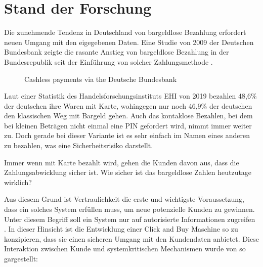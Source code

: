 \section{Stand der Forschung}


Die zunehmende Tendenz in Deutschland von bargeldlose Bezahlung erfordert neuen Umgang mit den 
eigegebenen Daten. Eine Studie von 2009 der Deutschen Bundesbank zeigte die rasante Anstieg von 
bargeldlose Bezahlung in der Bundesrepublik seit der Einführung von solcher Zahlungsmethode 
\cite{refrep:DBCP}.

\begin{figure}[htb]
    \caption{Cashless payments via the Deutsche Bundesbank}
    \label{fig:refrep_DB}
\end{figure}


Laut einer Statistik des Handelsforschungsinstituts EHI von 2019 \cite{refart:KSDL} bezahlen 48,6\% 
der deutschen ihre Waren mit Karte, wohingegen nur noch 46,9\% der deutschen den klassischen 
Weg mit Bargeld gehen. Auch das kontaklose Bezahlen, bei dem bei kleinen Beträgen nicht einmal eine
PIN gefordert wird, nimmt immer weiter zu. Doch gerade bei dieser Variante ist es sehr einfach
im Namen eines anderen zu bezahlen, was eine Sicherheitsrisiko darstellt.


Immer wenn mit Karte bezahlt wird, gehen die Kunden davon aus, dass die Zahlungsabwicklung sicher ist. 
Wie sicher ist das bargeldlose Zahlen heutzutage wirklich? 


Aus diesem Grund ist Vertraulichkeit die erste und wichtigste Voraussetzung, dass ein solches System 
erfüllen muss, um neue potenzielle Kunden zu gewinnen. Unter diesem Begriff soll ein System nur auf 
autorisierte Informationen zugreifen \cite{refbook:SWIS}. In dieser Hinsicht ist die Entwicklung 
einer Click and Buy Maschine so zu konzipieren, dass sie einen sicheren Umgang mit den Kundendaten
anbietet. Diese Interaktion zwischen Kunde und systemkritischen Mechanismen wurde von \cite{refart:HARE}
so gargestellt: 

